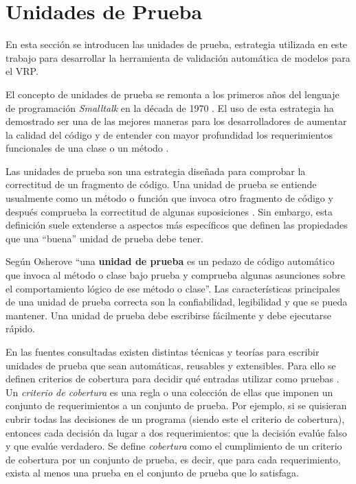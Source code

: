 \section{Unidades de Prueba}\label{sec:unitTesting}
En esta sección se introducen las unidades de prueba, estrategia utilizada en este trabajo para desarrollar la herramienta de validación automática de modelos para el VRP.

El concepto de unidades de prueba se remonta a los primeros años del lenguaje de programación {\it Smalltalk} en la década de 1970 \cite{ammann@introSoftTest}. El uso de esta estrategia ha demostrado ser una de las mejores maneras para los desarrolladores de aumentar la calidad del código y de entender con mayor profundidad los requerimientos funcionales de una clase o un método \cite{ammann@introSoftTest, manning@UT}. 

Las unidades de prueba son una estrategia diseñada para comprobar la correctitud de un fragmento de código. Una unidad de prueba se entiende usualmente como un método o función que invoca otro fragmento de código y después comprueba la correctitud de algunas suposiciones \cite{manning@UT}. Sin embargo, esta definición suele extenderse a aspectos más específicos que definen las propiedades que una ``buena'' unidad de prueba debe tener.

Según Osherove \cite{manning@UT} ``una {\bf unidad de prueba} es un pedazo de código automático que invoca al método o clase bajo prueba y comprueba algunas asunciones sobre el comportamiento lógico de ese método o clase''. Las características principales de una unidad de prueba correcta son la confiabilidad, legibilidad y que se pueda mantener. Una unidad de prueba debe escribirse fácilmente y debe ejecutarse rápido.

En las fuentes consultadas existen distintas técnicas y teorías para escribir unidades de prueba que sean automáticas, reusables y extensibles. Para ello se definen criterios de cobertura para decidir qué entradas utilizar como pruebas \cite{ammann@introSoftTest}. Un {\it criterio de cobertura} es una regla o una colección de ellas que imponen un conjunto de requerimientos a un conjunto de prueba. Por ejemplo, si se quisieran cubrir todas las decisiones de un programa (siendo este el criterio de cobertura), entonces cada decisión da lugar a dos requerimientos: que la decisión evalúe falso y que evalúe verdadero. Se define {\it cobertura} como el cumplimiento de un criterio de cobertura por un conjunto de prueba, es decir, que para cada requerimiento, exista al menos una prueba en el conjunto de prueba que lo satisfaga.

